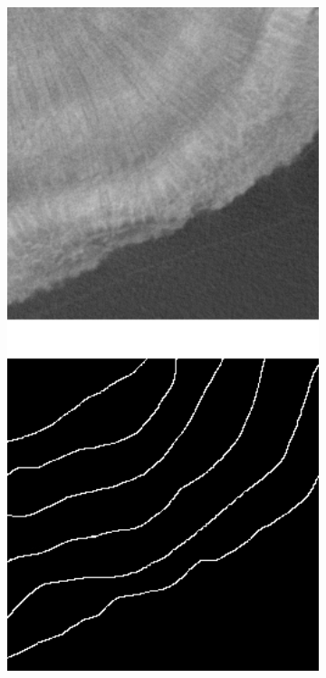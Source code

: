 \begin{figure}[t]
    \centering
    \begin{subfigure}[t]{0.18\textwidth}
        \centering
        \includegraphics[width=1\textwidth, valign=c]{images/orig-aug.png}

\end{subfigure}
\end{figure}
